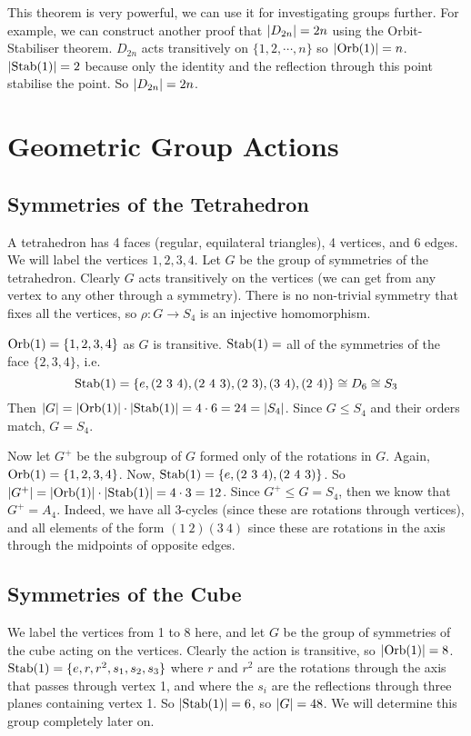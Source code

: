 \documentclass{article}
\begin{document}
	This theorem is very powerful, we can use it for investigating groups further. For example, we can construct another proof that $\abs{D_{2n}} = 2n$ using the Orbit-Stabiliser theorem. $D_{2n}$ acts transitively on $\{1, 2, \cdots, n\}$ so $\abs{\operatorname{Orb}(1)} = n$. $\abs{\operatorname{Stab}(1)} = 2$ because only the identity and the reflection through this point stabilise the point. So $\abs{D_{2n}} = 2n$.

	\section{Geometric Group Actions}
	\subsection{Symmetries of the Tetrahedron}
	A tetrahedron has 4 faces (regular, equilateral triangles), 4 vertices, and 6 edges. We will label the vertices $1, 2, 3, 4$. Let $G$ be the group of symmetries of the tetrahedron. Clearly $G$ acts transitively on the vertices (we can get from any vertex to any other through a symmetry). There is no non-trivial symmetry that fixes all the vertices, so $\rho\colon G \to S_4$ is an injective homomorphism.

	$\operatorname{Orb}(1) = \{ 1, 2, 3, 4 \}$ as $G$ is transitive. $\operatorname{Stab}(1) =$ all of the symmetries of the face $\{2,3,4\}$, i.e.
	\[ \operatorname{Stab}(1) = \{ e, (2\ 3\ 4), (2\ 4\ 3), (2\ 3), (3\ 4), (2\ 4) \} \cong D_6 \cong S_3 \]
	Then $\abs{G} = \abs{\operatorname{Orb}(1)} \cdot \abs{\operatorname{Stab}(1)} = 4 \cdot 6 = 24 = \abs{S_4}$. Since $G \leq S_4$ and their orders match, $G = S_4$.

	Now let $G^+$ be the subgroup of $G$ formed only of the rotations in $G$. Again, $\operatorname{Orb}(1) = \{ 1, 2, 3, 4 \}$. Now, $\operatorname{Stab}(1) = \{ e, (2\ 3\ 4), (2\ 4\ 3) \}$. So $\abs{G^+} = \abs{\operatorname{Orb}(1)} \cdot \abs{\operatorname{Stab}(1)} = 4 \cdot 3 = 12$. Since $G^+ \leq G = S_4$, then we know that $G^+ = A_4$. Indeed, we have all 3-cycles (since these are rotations through vertices), and all elements of the form $(1\ 2)(3\ 4)$ since these are rotations in the axis through the midpoints of opposite edges.

	\subsection{Symmetries of the Cube}
	We label the vertices from 1 to 8 here, and let $G$ be the group of symmetries of the cube acting on the vertices. Clearly the action is transitive, so $\abs{\operatorname{Orb}(1)} = 8$. $\operatorname{Stab}(1) = \{ e, r, r^2, s_1, s_2, s_3 \}$ where $r$ and $r^2$ are the rotations through the axis that passes through vertex 1, and where the $s_i$ are the reflections through three planes containing vertex 1. So $\abs{\operatorname{Stab}(1)} = 6$, so $\abs{G} = 48$. We will determine this group completely later on.
\end{document}
